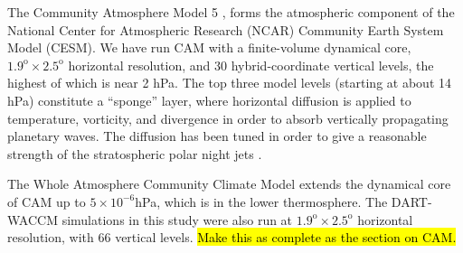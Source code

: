 The Community Atmosphere Model 5 \citep[CAM5]{nealeetal2010}, forms the atmospheric component of the National Center for Atmospheric Research (NCAR) Community Earth System Model (CESM). 
We have run CAM with a finite-volume dynamical core, $1.9^{\text{o}} \times 2.5^{\text{o}}$ horizontal resolution, and  30 hybrid-coordinate vertical levels, the highest of which is near 2 hPa.
The top three model levels (starting at about 14 hPa) constitute a ``sponge'' layer, where horizontal diffusion is applied to temperature, vorticity, and divergence in order to absorb vertically propagating planetary waves.  
The diffusion has been tuned in order to give a reasonable strength of the stratospheric polar night jets \citep{nealeetal2010}.

The Whole Atmosphere Community Climate Model \citep[WACCM]{Marsh2013} extends the dynamical core of CAM up to $5 \times 10^{-6}$hPa, which is in the lower thermosphere. 
The DART-WACCM simulations in this study were also run at $1.9^{\text{o}} \times 2.5^{\text{o}}$ horizontal resolution, with 66 vertical levels. 
\hl{Make this as complete as the section on CAM.}
